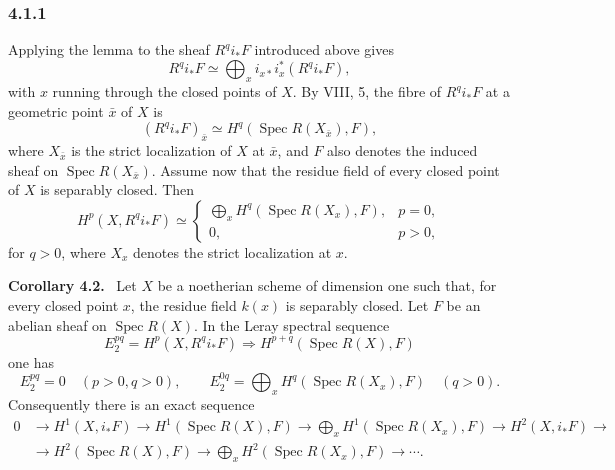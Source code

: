 \documentclass[11pt]{article}
\newcommand{\Spec}{\operatorname{Spec}}
\newenvironment{statement}[1]{\par\medskip\noindent\textbf{#1.}\ }{\par\medskip}
\begin{document}
\subsubsection*{4.1.1}
Applying the lemma to the sheaf \(R^qi_*F\) introduced above gives
\[
R^qi_*F\simeq \bigoplus_x i_{x*}i_x^*(R^qi_*F),
\]
with \(x\) running through the closed points of \(X\). By VIII, 5, the fibre of \(R^qi_*F\) at a geometric point \(\bar x\) of \(X\) is
\[
(R^qi_*F)_{\bar x}\simeq H^q(\Spec R(X_{\bar x}),F),
\]
where \(X_{\bar x}\) is the strict localization of \(X\) at \(\bar x\), and \(F\) also denotes the induced sheaf on \(\Spec R(X_{\bar x})\). Assume now that the residue field of every closed point of \(X\) is separably closed. Then
\[
H^p(X,R^qi_*F)\simeq
\begin{cases}
\displaystyle\bigoplus_x H^q(\Spec R(X_x),F),&p=0,\\
0,&p>0,
\end{cases}
\]
for \(q>0\), where \(X_x\) denotes the strict localization at \(x\).

\begin{statement}{Corollary 4.2}
Let \(X\) be a noetherian scheme of dimension one such that, for every closed point \(x\), the residue field \(k(x)\) is separably closed. Let \(F\) be an abelian sheaf on \(\Spec R(X)\). In the Leray spectral sequence
\[
E_2^{pq}=H^p(X,R^qi_*F)\Longrightarrow H^{p+q}(\Spec R(X),F)
\]
one has
\[
E_2^{pq}=0\quad(p>0, q>0),\qquad
E_2^{0q}=\bigoplus_x H^q(\Spec R(X_x),F)\quad(q>0).
\]
Consequently there is an exact sequence
\[
\begin{aligned}
0&\to H^1(X,i_*F)\to H^1(\Spec R(X),F)\to\bigoplus_x H^1(\Spec R(X_x),F)\to H^2(X,i_*F)\to{}\\
&\to H^2(\Spec R(X),F)\to\bigoplus_x H^2(\Spec R(X_x),F)\to\cdots .
\end{aligned}
\]
\end{statement}
\end{document}
